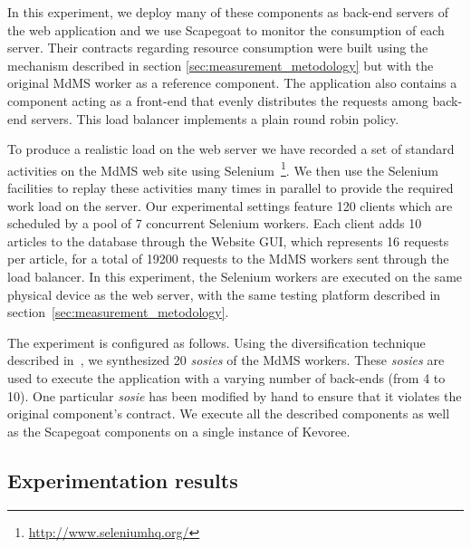 In this experiment, we deploy many of these components as back-end servers of the web application and we use Scapegoat to monitor the consumption of each server.
Their contracts regarding resource consumption were built using the mechanism described in section \ref{sec:measurement_metodology} but with the original MdMS worker as a reference component.
The application also contains a component acting as a front-end that evenly distributes the requests among back-end servers.
This load balancer implements a plain round robin policy.

To produce a realistic load on the web server we have recorded a set of standard activities on the MdMS web site using Selenium~\footnote{\url{http://www.seleniumhq.org/}}.
We then use the Selenium facilities to replay these activities many times in parallel to provide the required work load on the server.
Our experimental settings feature 120 clients which are scheduled by a pool of 7 concurrent Selenium workers.
Each client adds 10 articles to the database through the Website GUI, which represents 16 requests per article, for a total of 19200 requests to the MdMS workers sent through the load balancer.
In this experiment, the Selenium workers are executed on the same physical device as the web server, with the same testing platform described in section~\ref{sec:measurement_metodology}.

The experiment is configured as follows.
Using the diversification technique described in~\cite{baudry2014tailored}, we synthesized 20 \textit{sosies} of the MdMS workers.
These \textit{sosies} are used to execute the application with a varying number of back-ends (from 4 to 10).
One particular \textit{sosie} has been modified by hand to ensure that it violates the original component's contract.
We execute all the described components as well as the Scapegoat components on a single instance of Kevoree.

\subsection{Experimentation results}

